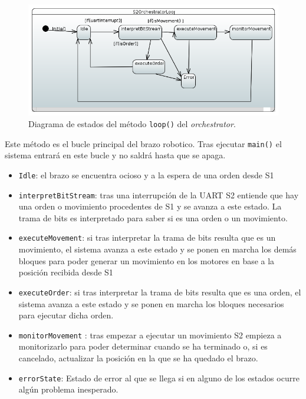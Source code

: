 \begin{figure}[H]
    \centering
    \includegraphics[width=1\linewidth]{pictures/S2OrchestratorLoop.PNG}
    \caption{Diagrama de estados del método \texttt{loop()} del \textit{orchestrator}.}
    \label{fig:fun_loop_orchestrator}
\end{figure}

Este método es el bucle principal del brazo robotico. Tras ejecutar \texttt{main()} el sistema entrará en este bucle y no saldrá hasta que se apaga.

\begin{itemize}
    \item \texttt{Idle}: el brazo se encuentra ocioso y a la espera de una orden desde \ac{S1}
    \item \texttt{interpretBitStream}: tras una interrupción de la UART \ac{S2} entiende que hay una orden o movimiento procedentes de \ac{S1} y se avanza a este estado. La trama de bits es interpretado para saber si es una orden o un movimiento.
    \item \texttt{executeMovement}: si tras interpretar la trama de bits resulta que es un movimiento, el sistema avanza a este estado y se ponen en marcha los demás bloques para poder generar un movimiento en los motores en base a la posición recibida desde \ac{S1}
    \item \texttt{executeOrder}: si tras interpretar la trama de bits resulta que es una orden, el sistema avanza a este estado y se ponen en marcha los bloques necesarios para ejecutar dicha orden.
    \item \texttt{monitorMovement} : tras empezar a ejecutar un movimiento \ac{S2} empieza a monitorizarlo para poder determinar cuando se ha terminado o, si es cancelado, actualizar la posición en la que se ha quedado el brazo.
    \item \texttt{errorState}: Estado de error al que se llega si en alguno de los estados ocurre algún problema inesperado. 
    
    
\end{itemize}

